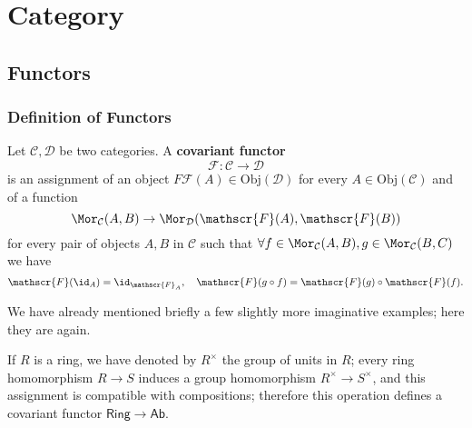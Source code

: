 \chapter{Category}
\section{Functors}
\subsection{Definition of Functors}
\begin{definition}
Let $\mathcal{C},\mathcal{D}$ be two categories. A \textbf{covariant functor}
\[\mathscr{F}:\mathcal{C}\to\mathcal{D}\]
is an assignment of an object $F\mathscr{F}(A)\in\mathrm{Obj}(\mathcal{D})$ for every $A\in\mathrm{Obj}(\mathcal{C})$ and of a function
\[\Mor_{\mathcal{C}}(A,B)\to\Mor_{\mathcal{D}}(\mathscr{F}(A),\mathscr{F}(B))\]
for every pair of objects $A,B$ in $\mathcal{C}$ such that $\forall f\in\Mor_{\mathcal{C}}(A,B),g\in\Mor_{\mathcal{C}}(B,C)$ we have
\[\mathscr{F}(\id_A)=\id_{\mathscr{F}_{A}},\quad\mathscr{F}(g\circ f)=\mathscr{F}(g)\circ\mathscr{F}(f).\]
\end{definition}
We have already mentioned briefly a few slightly more imaginative examples; here they are again.
\begin{example}
If $R$ is a ring, we have denoted by $R^{\times}$ the group of units in $R$; every ring homomorphism $R\to S$ induces a group homomorphism $R^{\times}\to S^{\times}$, and this assignment is compatible with compositions; therefore this operation defines a covariant functor $\mathsf{Ring}\to\mathsf{Ab}$.
\end{example}
